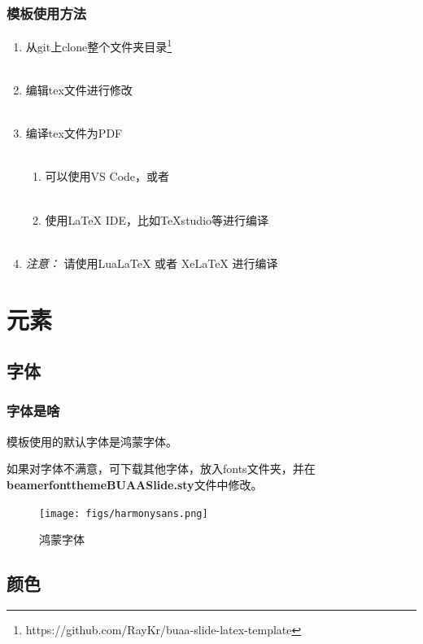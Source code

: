 \documentclass[aspectratio=169,UTF8,t]{beamer}%
\begin{document}
\begin{frame}
    \frametitle{模板使用方法}    
    \begin{enumerate}
        \item 从git上clone整个文件夹目录\footnote{https://github.com/RayKr/buaa-slide-latex-template}\\~
        \item 编辑tex文件进行修改\\~
        \item 编译tex文件为PDF\\~
        \begin{enumerate}
            \item 可以使用VS Code，或者\\~
            \item 使用LaTeX IDE，比如TeXstudio等进行编译\\~
        \end{enumerate}
        \item \emph{注意：} 请使用LuaLaTeX 或者 XeLaTeX 进行编译
    \end{enumerate}
\end{frame}

\section{元素}

\subsection{字体}

\begin{frame}
    \frametitle{字体是啥}
    模板使用的默认字体是鸿蒙字体。

    如果对字体不满意，可下载其他字体，放入fonts文件夹，并在\textbf{beamerfontthemeBUAASlide.sty}文件中修改。
    \begin{center}
        \begin{figure}
        \centering
        \texttt{[image: figs/harmonysans.png]}
            \caption{鸿蒙字体}
            \label{fig:harmonysans}
        \end{figure}
    \end{center}
\end{frame}

\subsection{颜色}
\end{document}
